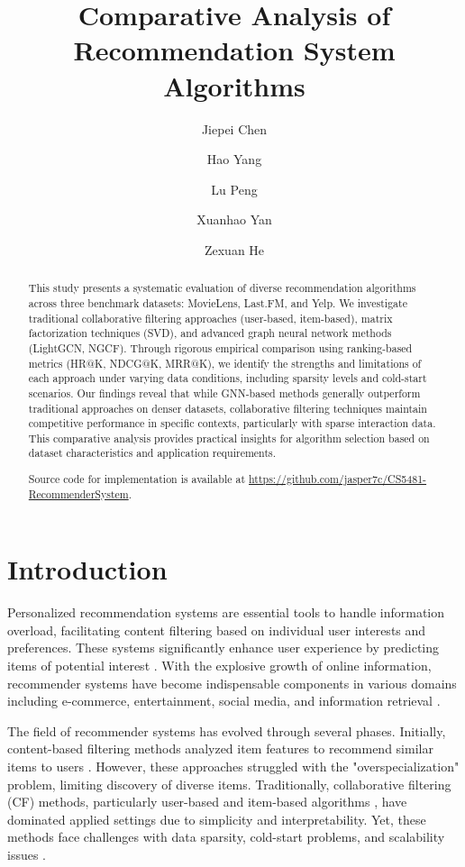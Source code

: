 \documentclass[sigconf,nonacm]{acmart} %
\title{Comparative Analysis of Recommendation System Algorithms}
\author{Jiepei Chen}
\affiliation{
  \institution{City University of HongKong (Dongguan)}
}
\author{Hao Yang}
\affiliation{
  \institution{City University of HongKong (Dongguan)}
}
\author{Lu Peng}
\affiliation{
  \institution{City University of HongKong (Dongguan)}
}
\author{Xuanhao Yan}
\affiliation{
  \institution{City University of HongKong (Dongguan)}
}
\author{Zexuan He}
\affiliation{
  \institution{City University of HongKong (Dongguan)}
}
\begin{document}
\fancyhead{} %

\begin{abstract}

This study presents a systematic evaluation of diverse recommendation algorithms across three benchmark datasets: MovieLens, Last.FM, and Yelp. We investigate traditional collaborative filtering approaches (user-based, item-based), matrix factorization techniques (SVD), and advanced graph neural network methods (LightGCN, NGCF). Through rigorous empirical comparison using ranking-based metrics (HR@K, NDCG@K, MRR@K), we identify the strengths and limitations of each approach under varying data conditions, including sparsity levels and cold-start scenarios. Our findings reveal that while GNN-based methods generally outperform traditional approaches on denser datasets, collaborative filtering techniques maintain competitive performance in specific contexts, particularly with sparse interaction data. This comparative analysis provides practical insights for algorithm selection based on dataset characteristics and application requirements.  

Source code for implementation is available at \url{https://github.com/jasper7c/CS5481-RecommenderSystem}. 
\end{abstract}

\maketitle

\section{Introduction}
Personalized recommendation systems are essential tools to handle information overload, facilitating content filtering based on individual user interests and preferences. These systems significantly enhance user experience by predicting items of potential interest \cite{ricci2011introduction}. With the explosive growth of online information, recommender systems have become indispensable components in various domains including e-commerce, entertainment, social media, and information retrieval \cite{adomavicius2005toward}.

The field of recommender systems has evolved through several phases. Initially, content-based filtering methods analyzed item features to recommend similar items to users \cite{pazzani2007content}. However, these approaches struggled with the "overspecialization" problem, limiting discovery of diverse items. Traditionally, collaborative filtering (CF) methods, particularly user-based and item-based algorithms \cite{sarwar2001item}, have dominated applied settings due to simplicity and interpretability. Yet, these methods face challenges with data sparsity, cold-start problems, and scalability issues \cite{su2009survey}.
\end{document}
